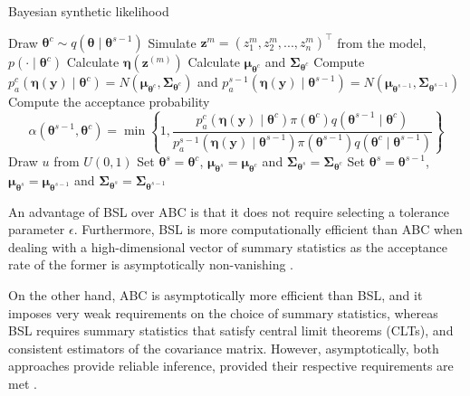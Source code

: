 \begin{algorithm}
	\caption{Bayesian synthetic likelihood}\label{BSL0}
	\begin{algorithmic}[1]
			\State Draw $\boldsymbol{\theta}^c\sim q(\boldsymbol{\theta}\mid \boldsymbol{\theta}^{s-1})$
				\State Simulate ${\boldsymbol z}^{m}=(z_{1}^{m},z_{2}^{m},...,z_{n}^{m})^{\top}$ from the model, $p(\cdot\mid{\boldsymbol{\theta} }^c)$
				\State Calculate $\boldsymbol{\eta}(\boldsymbol{z}^{(m)})$
			\EndFor 			 
			\State Calculate $\boldsymbol{\mu}_{\boldsymbol{\theta}^c}$ and $\boldsymbol{\Sigma}_{\boldsymbol{\theta}^c}$
			\State Compute $p_a^c(\boldsymbol{\eta}(\boldsymbol{y})\mid \boldsymbol{\theta}^c) = N(\boldsymbol{\mu}_{\boldsymbol{\theta}^c}, \boldsymbol{\Sigma}_{\boldsymbol{\theta}^c})$ and $p_a^{s-1}(\boldsymbol{\eta}(\boldsymbol{y})\mid \boldsymbol{\theta}^{s-1}) = N(\boldsymbol{\mu}_{\boldsymbol{\theta}^{s-1}}, \boldsymbol{\Sigma}_{\boldsymbol{\theta}^{s-1}})$
			\State Compute the acceptance probability
			$$\alpha(\boldsymbol{\theta}^{s-1},\boldsymbol{\theta}^c)=\min\left\{1,\frac{p_a^c(\boldsymbol{\eta}(\boldsymbol{y})\mid \boldsymbol{\theta}^c)\pi(\boldsymbol{\theta}^c)q(\boldsymbol{\theta}^{s-1}\mid \boldsymbol{\theta}^{c})}{p_a^{s-1}(\boldsymbol{\eta}(\boldsymbol{y})\mid \boldsymbol{\theta}^{s-1})\pi(\boldsymbol{\theta}^{s-1})q(\boldsymbol{\theta}^{c}\mid \boldsymbol{\theta}^{s-1})}\right\}$$
			\State Draw $u$ from $U(0,1)$
				\State Set $\boldsymbol{\theta}^{s}=\boldsymbol{\theta}^{c}$, $\boldsymbol{\mu}_{\boldsymbol{\theta}^{s}}=\boldsymbol{\mu}_{\boldsymbol{\theta}^c}$ and $\boldsymbol{\Sigma}_{\boldsymbol{\theta}^s}=\boldsymbol{\Sigma}_{\boldsymbol{\theta}^c}$
			\Else
				\State Set $\boldsymbol{\theta}^{s}=\boldsymbol{\theta}^{s-1}$, $\boldsymbol{\mu}_{\boldsymbol{\theta}^{s}}=\boldsymbol{\mu}_{\boldsymbol{\theta}^{s-1}}$ and $\boldsymbol{\Sigma}_{\boldsymbol{\theta}^s}=\boldsymbol{\Sigma}_{\boldsymbol{\theta}^{s-1}}$
			\EndIf  
		\EndFor
	\end{algorithmic}
\end{algorithm}

An advantage of BSL over ABC is that it does not require selecting a tolerance parameter $\epsilon$. Furthermore, BSL is more computationally efficient than ABC when dealing with a high-dimensional vector of summary statistics as the acceptance rate of the former is asymptotically non-vanishing \cite{nott2023bayesian}.  

On the other hand, ABC is asymptotically more efficient than BSL, and it imposes very weak requirements on the choice of summary statistics, whereas BSL requires summary statistics that satisfy central limit theorems (CLTs), and consistent estimators of the covariance matrix. However, asymptotically, both approaches provide reliable inference, provided their respective requirements are met \cite{martin2024approximating}.  

